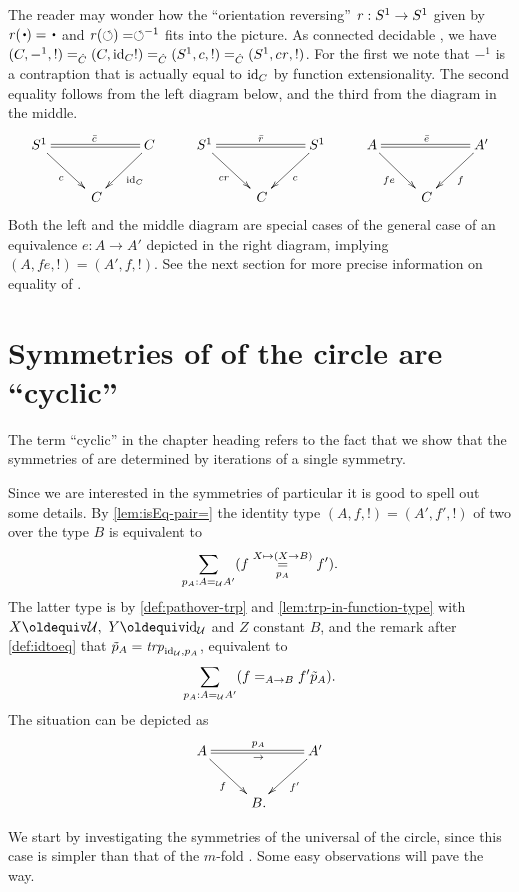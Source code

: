 \begin{remark}
  \label{rem:flipthecircle}
The reader may wonder how the ``orientation reversing'' $\mathit{r}:{S^1}\to {S^1}$ given
by $\revers(\base)=\base$ and $\mathit{r}(\circlearrowleft)=\circlearrowleft^{-1}$ fits into the picture.
As connected decidable \coverings, we have
$(C,-^1,!) =_{\hat C} (C,\mathord{\mathrm{id}}_C!) =_{\hat C} ({S^1},c,!) =_{\hat C} ({S^1},c\mathit{r},!)$.
For the first we note that $-^1$ is a contraption that is actually equal to 
$\mathord{\mathrm{id}}_C$ by function extensionality. The second equality follows from the left
diagram below, and the third from the diagram in the middle.
\[
\xymatrix{
\Sc\ar@{=}[rr]^{\etop{c}}\ar[dr]_{c}&&C\ar[dl]^{\id_C} &
\Sc\ar@{=}[rr]^{\etop{r}}\ar[dr]_{cr}&&\Sc\ar[dl]^{c} &
A\ar@{=}[rr]^{\etop{e}}\ar[dr]_{fe}&&A'\ar[dl]^{f}
\\
&\,C&&&\,C&&&\,C&}
\]
Both the left and the middle diagram are special cases of the general case of an equivalence
$e: A\to A'$ depicted in the right diagram, implying $(A,fe,!)=(A',f,!)$.
See the next section for more precise information on equality of \coverings.
\end{remark}


\section{Symmetries of \coverings of the circle are ``cyclic'' }
\label{sec:deckS1}

The term ``cyclic'' in the chapter heading refers to the fact that we show 
that the symmetries of \coverings are determined by iterations of a single symmetry.  

\begin{remark}
Since we are interested in the symmetries of particular \coverings it is 
good to spell out some details.
By \cref{lem:isEq-pair=} the identity type $(A,f,!)=(A',f',!)$ of 
two \coverings over the type $B$ is equivalent to
\[
\sum_{p_A:A=_{\mathcal{U}}A'}({f} \overset{X\mapsto(X\to B)}{\underset{p_A}=} f'). 
\]
The latter type is by \cref{def:pathover-trp} and \cref{lem:trp-in-function-type}
with $X\jdeq\UU,~Y\jdeq\id_{\UU}$ and $Z$ constant $B$, and the remark
after \cref{def:idtoeq} that $\tilde {p}_A = \mathop{\mathit{trp}_{\mathord{\mathrm{id}}_{\mathcal{U}},p_A}}$, equivalent to
\[
\sum_{p_A:A=_{\mathcal{U}}A'}(f =_{A\to B}f'\tilde {p}_A). 
\]
The situation can be depicted as
$$\xymatrix{A\ar@{=}[rr]^{p_A}_\to\ar[dr]_f&&A'\ar[dl]^{f'}\\&\,B.&}$$
\end{remark}

We start by investigating the symmetries of the universal \covering of the circle,
since this case is simpler than that of the $m$-fold \coverings.
Some easy observations will pave the way. 

